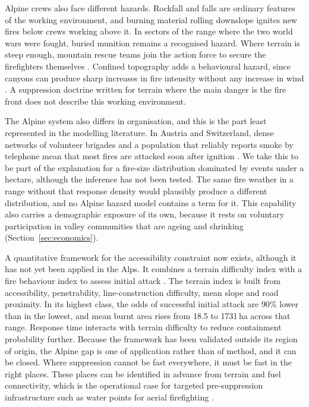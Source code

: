 \documentclass[11pt,a4paper]{article}
\begin{document}
Alpine crews also face different hazards. Rockfall and falls are ordinary features of the working environment, and burning material rolling downslope ignites new fires below crews working above it. In sectors of the range where the two world wars were fought, buried munition remains a recognised hazard. Where terrain is steep enough, mountain rescue teams join the action force to secure the firefighters themselves \citep{muller_forest_2020}. Confined topography adds a behavioural hazard, since canyons can produce sharp increases in fire intensity without any increase in wind \citep{muller_forest_2020, hayajneh_wind_2026}. A suppression doctrine written for terrain where the main danger is the fire front does not describe this working environment.

The Alpine system also differs in organisation, and this is the part least represented in the modelling literature. In Austria and Switzerland, dense networks of volunteer brigades and a population that reliably reports smoke by telephone mean that most fires are attacked soon after ignition \citep{muller_forest_2020}. We take this to be part of the explanation for a fire-size distribution dominated by events under a hectare, although the inference has not been tested. The same fire weather in a range without that response density would plausibly produce a different distribution, and no Alpine hazard model contains a term for it. This capability also carries a demographic exposure of its own, because it rests on voluntary participation in valley communities that are ageing and shrinking (Section~\ref{sec:economics}).

A quantitative framework for the accessibility constraint now exists, although it has not yet been applied in the Alps. It combines a terrain difficulty index with a fire behaviour index to assess initial attack \citep{cardil_assessing_2025}. The terrain index is built from accessibility, penetrability, line-construction difficulty, mean slope and road proximity. In its highest class, the odds of successful initial attack are 90\% lower than in the lowest, and mean burnt area rises from 18.5 to 1731\,ha across that range. Response time interacts with terrain difficulty to reduce containment probability further. Because the framework has been validated outside its region of origin, the Alpine gap is one of application rather than of method, and it can be closed. Where suppression cannot be fast everywhere, it must be fast in the right places. These places can be identified in advance from terrain and fuel connectivity, which is the operational case for targeted pre-suppression infrastructure such as water points for aerial firefighting \citep{conedera_linking_2024}.
\end{document}
